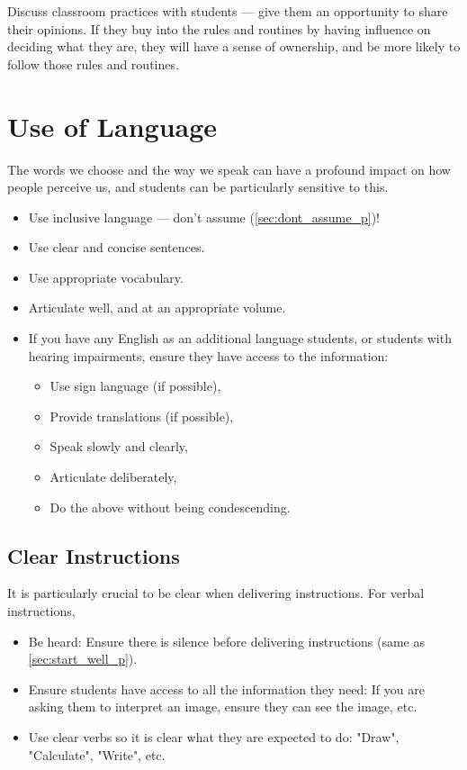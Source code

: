 \documentclass[12pt]{report}
\begin{document}
Discuss classroom practices with students --- give them an opportunity to share their opinions. If they buy into the rules and routines by having influence on deciding what they are, they will have a sense of ownership, and be more likely to follow those rules and routines.



\section{Use of Language}
\label{sec:language_p}

The words we choose and the way we speak can have a profound impact on how people perceive us, and students can be particularly sensitive to this.

\begin{itemize}
  \item Use inclusive language --- don't assume (\ref{sec:dont_assume_p})!
  \item Use clear and concise sentences.
  \item Use appropriate vocabulary.
  \item Articulate well, and at an appropriate volume.
  \item If you have any English as an additional language students, or students with hearing impairments, ensure they have access to the information: 
  \begin{itemize}
    \item Use sign language (if possible), 
    \item Provide translations (if possible), 
    \item Speak slowly and clearly, 
    \item Articulate deliberately,
    \item Do the above without being condescending.
  \end{itemize}
\end{itemize}

\subsection{Clear Instructions}
\label{sec:clear_instructions_p}

It is particularly crucial to be clear when delivering instructions. For verbal instructions,
\begin{itemize}
  \item Be heard: Ensure there is silence before delivering instructions (same as \ref{sec:start_well_p}).
  \item Ensure students have access to all the information they need: If you are asking them to interpret an image, ensure they can see the image, etc. 
  \item Use clear verbs so it is clear what they are expected to do: "Draw", "Calculate", "Write", etc.
\end{itemize}
\end{document}
